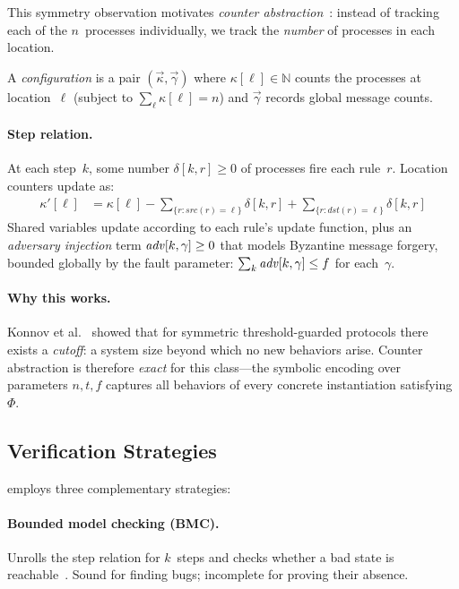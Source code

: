 This symmetry observation motivates \emph{counter
abstraction}~\cite{EmersonNamjoshi1995}: instead of tracking each of
the $n$~processes individually, we track the \emph{number} of processes
in each location.

A \emph{configuration} is a pair $(\vec\kappa, \vec\gamma)$ where
$\kappa[\ell] \in \mathbb{N}$ counts the processes at location~$\ell$
(subject to $\sum_{\ell} \kappa[\ell] = n$) and $\vec\gamma$ records
global message counts.

\paragraph{Step relation.}
At each step~$k$, some number $\delta[k,r] \geq 0$ of processes fire
each rule~$r$.  Location counters update as:
\begin{align}
  \kappa'[\ell] &= \kappa[\ell]
    - \sum_{\{r : \mathit{src}(r)=\ell\}} \delta[k,r]
    + \sum_{\{r : \mathit{dst}(r)=\ell\}} \delta[k,r]
  \label{eq:kappa-update}
\end{align}
Shared variables update according to each rule's update function, plus
an \emph{adversary injection} term $\mathit{adv}[k,\gamma] \geq 0$ that models
Byzantine message forgery, bounded globally by the fault parameter:
$\sum_{k} \mathit{adv}[k,\gamma] \leq f$ for each~$\gamma$.

\paragraph{Why this works.}
Konnov et al.~\cite{KonnovLVW2017} showed that for symmetric
threshold-guarded protocols there exists a \emph{cutoff}: a system size
beyond which no new behaviors arise.  Counter abstraction is therefore
\emph{exact} for this class---the symbolic encoding over parameters
$n, t, f$ captures all behaviors of every concrete instantiation
satisfying~$\Phi$.

\subsection{Verification Strategies}

\tarsier{} employs three complementary strategies:

\paragraph{Bounded model checking (BMC).}
Unrolls the step relation for $k$~steps and checks whether a bad state
is reachable~\cite{BiereCCSZ1999}.  Sound for finding bugs; incomplete
for proving their absence.

